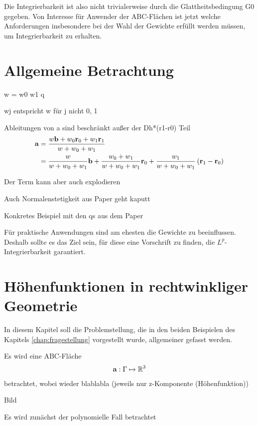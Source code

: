 \documentclass[10pt,a4paper,oneside]{report}
\newcommand{\R}{\mathbb{R}}
\begin{document}
Die Integrierbarkeit ist also nicht trivialerweise durch die Glattheitsbedingung G0 gegeben.
Von Interesse für Anwender der ABC-Flächen ist jetzt welche Anforderungen insbesondere bei der Wahl der Gewichte erfüllt werden müssen, um Integrierbarkeit zu erhalten.

\chapter{Allgemeine Betrachtung}

w = w0 w1 q

wj entspricht w für j nicht 0, 1

Ableitungen von a sind beschränkt außer der Dh*(r1-r0) Teil
\begin{align*}
\bold{a} &= \frac{w\bold{b} + w_0 \bold{r}_0+ w_1 \bold{r}_1}{w + w_0 + w_1} \\
&= \frac{w}{w+w_0+w_1} \bold{b} + \frac{w_0 + w_1}{w+w_0+w_1} \bold{r}_0 + \frac{w_1}{w+w_0+w_1} \left(\bold{r}_1-\bold{r}_0\right)
\end{align*}


Der Term kann aber auch explodieren

Auch Normalenstetigkeit aus Paper geht kaputt

Konkretes Beispiel mit den qs aus dem Paper

Für praktische Anwendungen sind am ehesten die Gewichte zu beeinflussen.
Deshalb sollte es das Ziel sein, für diese eine Vorschrift zu finden, die $L^p$-Integrierbarkeit garantiert.

\chapter{Höhenfunktionen in rechtwinkliger Geometrie}

In diesem Kapitel soll die Problemstellung, die in den beiden Beispielen des Kapitels \ref{chap:fragestellung} vorgestellt wurde, allgemeiner gefasst werden.

Es wird eine ABC-Fläche 
\begin{align*}
\bold{a}: \Gamma \mapsto \R^3
\end{align*}
betrachtet, wobei wieder blablabla
(jeweils nur z-Komponente (Höhenfunktion))

Bild

Es wird zunächst der polynomielle Fall betrachtet
\end{document}
